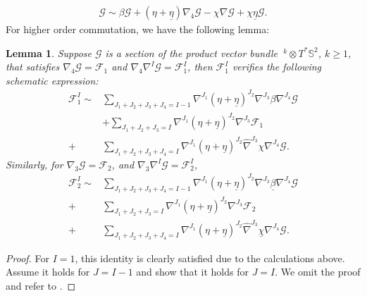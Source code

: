 \documentclass{amsart}
\newtheorem{lemma}{Lemma}[section]
\begin{document}
{\begin{eqnarray}
[\nabla_{4},\nabla_{A}]\mathcal{G}\sim \beta\mathcal{G}+(\eta+\underline{\eta})\nabla_{4}\mathcal{G}-\chi\nabla\mathcal{G}+\chi\underline{\eta}\mathcal{G}.
\end{eqnarray}
 For higher order commutation, we have the following lemma:\\
\begin{lemma} 
\label{commutation}
\textit{Suppose $\mathcal{G}$ is a section of the product vector bundle $~^{k}\otimes T^{*}\mathbb{S}^{2}$, $k\geq 1$,  that satisfies $\nabla_{4}\mathcal{G}=\mathcal{F}_{1}$ and $\nabla_{4}\nabla^{I}\mathcal{G}=\mathcal{F}^{I}_{1}$, then $\mathcal{F}^{I}_{1}$ verifies the following schematic expression:}
\begin{equation}
\begin{split}
\mathcal{F}^{I}_{1}\sim&\sum_{J_{1}+J_{2}+J_{3}+J_{4}=I-1}\nabla^{J_{1}}(\eta+\underline{\eta})^{J_{2}}\nabla^{J_{3}}\beta\nabla^{J_{4}}\mathcal{G}\\
&+\sum_{J_{1}+J_{2}+J_{3}=I}\nabla^{J_{1}}(\eta+\underline{\eta})^{J_{2}}\nabla^{J_{3}}\mathcal{F}_{1}\\+&\sum_{J_{1}+J_{2}+J_{3} +J_{4}=I}\nabla^{J_{1}}(\eta+\underline{\eta})^{J_{2}}\hat{\nabla}^{J_{3}}\chi\nabla^{J_{4}}\mathcal{G}.
\end{split}
\end{equation}
Similarly, for $\nabla_{3}\mathcal{G}=\mathcal{F}_{2}$, and $\nabla_{3}\nabla^{I}\mathcal{G}=\mathcal{F}^{I}_{2}$, 
\begin{equation}
\begin{split}
\mathcal{F}^{I}_{2}\sim &\sum_{J_{1}+J_{2}+J_{3}+J_{4}=I-1}\nabla^{J_{1}}(\eta+\underline{\eta})^{J_{2}}\nabla^{J_{3}}\underline{\beta}\nabla^{J_{4}}\mathcal{G}\\
+&\sum_{J_{1}+J_{2}+J_{3}=I}\nabla^{J_{1}}(\eta+\underline{\eta})^{J_{2}}\nabla^{J_{3}}\mathcal{F}_{2}\\+&\sum_{J_{1}+J_{2}+J_{3} +J_{4}=I}\nabla^{J_{1}}(\eta+\underline{\eta})^{J_{2}}\hat{\nabla}^{J_{3}}\underline{\chi}\nabla^{J_{4}}\mathcal{G}.
\end{split}
\end{equation}
\end{lemma}
\begin{proof}
For $I=1$, this identity is clearly satisfied due to the calculations above. Assume it holds for $J=I-1$ and show that it holds for $J=I$. We omit the proof and refer to \cite{AnAth}. 
\end{proof} 

}
\end{document}
